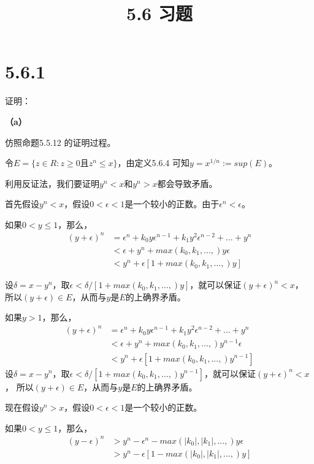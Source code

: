 \documentclass{article}
\theoremstyle{mystyle}
\begin{document}
\title{5.6 习题}
\maketitle

\section*{5.6.1}

证明：

\textbf{（a）}

仿照命题5.5.12 的证明过程。

令$E=\{z \in R: z \geq 0 \text{且} z^n \leq x\}$，由定义5.6.4 可知$y = x^{1/n} := sup(E)$。

利用反证法，我们要证明$y^n < x$和$y^n > x$都会导致矛盾。

首先假设$y^n < x$，假设$0<\epsilon<1$是一个较小的正数。由于$\epsilon ^n < \epsilon$。

如果$0< y \leq 1$，那么，
\begin{align}
  (y + \epsilon)^n & = \epsilon ^n + k_0y\epsilon^{n-1} + k_1y^2\epsilon^{n-2} + ... + y^n \\
                   & < \epsilon + y^n + max(k_0,k_1,...,)y\epsilon                         \\
                   & < y^n + \epsilon[1+max(k_0,k_1,...,)y]
\end{align}

设$\delta = x - y^n$，取$\epsilon < \delta / [1+max(k_0,k_1,...,)y]$，就可以保证$(y + \epsilon)^n < x$，
所以$(y + \epsilon) \in E$，从而与$y$是$E$的上确界矛盾。

如果$y>1$，那么，
\begin{align}
  (y + \epsilon)^n & = \epsilon ^n + k_0y\epsilon^{n-1} + k_1y^2\epsilon^{n-2} + ... + y^n \\
                   & < \epsilon + y^n + max(k_0,k_1,...,)y^{n-1}\epsilon                   \\
                   & < y^n + \epsilon[1+max(k_0,k_1,...,)y^{n-1}]
\end{align}
设$\delta = x - y^n$，取$\epsilon < \delta / [1+max(k_0,k_1,...,)y^{n-1}]$，就可以保证$(y + \epsilon)^n < x$，
所以$(y + \epsilon) \in E$，从而与$y$是$E$的上确界矛盾。

现在假设$y^n > x$，假设$0<\epsilon<1$是一个较小的正数。

如果$0< y \leq 1$，那么，
\begin{align}
  (y - \epsilon)^n & > y^n - \epsilon^n - max(|k_0|,|k_1|,...,)y\epsilon \\
                   & > y^n - \epsilon[1-max(|k_0|,|k_1|,...,)y]
\end{align}
\end{document}
